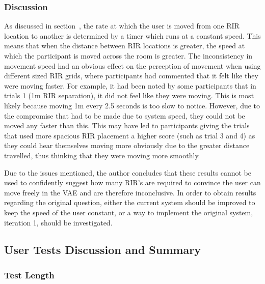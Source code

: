 \documentclass[../../main.tex]{subfiles}
\begin{document}
			\subsubsection{Discussion}

			As discussed in section~, the rate at which the user is moved from one \ac{RIR} location to another is determined by a timer which runs at a constant speed. This means that when the distance between \ac{RIR} locations is greater, the speed at which the participant is moved across the room is greater. The inconsistency in movement speed had an obvious effect on the perception of movement when using different sized \ac{RIR} grids, where participants had commented that it felt like they were moving faster. For example, it had been noted by some participants that in trials 1 (1m \ac{RIR} separation), it did not feel like they were moving. This is most likely because moving 1m every 2.5 seconds is too slow to notice. However, due to the compromise that had to be made due to system speed, they could not be moved any faster than this. This may have led to participants giving the trials that used more spacious \ac{RIR} placement a higher score (such as trial 3 and 4) as they could hear themselves moving more obviously due to the greater distance travelled, thus thinking that they were moving more smoothly.

			Due to the issues mentioned, the author concludes that these results cannot be used to confidently suggest how many \ac{RIR}'s are required to convince the user can move freely in the \ac{VAE} and are therefore inconclusive. In order to obtain results regarding the original question, either the current system should be improved to keep the speed of the user constant, or a way to implement the original system, iteration 1, should be investigated.

		\subsection{User Tests Discussion and Summary}

			\subsubsection{Test Length}
\end{document}
